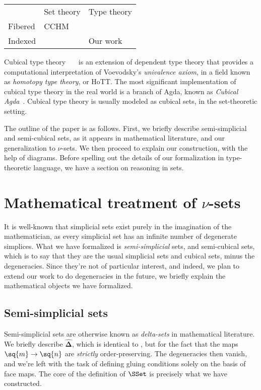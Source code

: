 \documentclass[10pt]{art.cls/art}
\newcommand{\DeltaHat}{\ensuremath{\hat{\boldsymbol{\Delta}}}}
\def\graymidrule{\arrayrulecolor{gray30}\midrule\arrayrulecolor{gray65}}
\begin{document}
\begin{table}[H]
  \begin{tabularx}{\linewidth}{p{.3\linewidth}|p{.3\linewidth}|p{.3\linewidth}}
    \toprule
            & Set theory & Type theory \\
    \graymidrule
    Fibered & CCHM       &             \\
    \graymidrule
    Indexed &            & Our work    \\
    \bottomrule
  \end{tabularx}
\end{table}

Cubical type theory~\cite{Bezem14}~\cite{Cohen16}~\cite{Angiuli17} is an extension of dependent type theory that provides a computational interpretation of Voevodsky's \emph{univalence axiom}, in a field known as \emph{homotopy type theory}, or HoTT. The most significant implementation of cubical type theory in the real world is a branch of Agda, known as \emph{Cubical Agda}~\cite{Vezzosi21}. Cubical type theory is usually modeled as cubical sets, in the set-theoretic setting.
\fi

The outline of the paper is as follows. First, we briefly describe semi-simplicial and semi-cubical sets, as it appears in mathematical literature, and our generalization to $\nu$-sets. We then proceed to explain our construction, with the help of diagrams. Before spelling out the details of our formalization in type-theoretic language, we have a section on reasoning in sets.

\section{Mathematical treatment of \texorpdfstring{$\nu$}{𝜈}-sets}
It is well-known that simplicial sets exist purely in the imagination of the mathematician, as every simplicial set has an infinite number of degenerate simplices. What we have formalized is \emph{semi-simplicial} sets, and semi-cubical sets, which is to say that they are the usual simplicial sets and cubical sets, minus the degeneracies. Since they're not of particular interest, and indeed, we plan to extend our work to do degeneracies in the future, we briefly explain the mathematical objects we have formalized.

\subsection{Semi-simplicial sets}
Semi-simplicial sets are otherwise known as \emph{delta-sets} in mathematical literature. We briefly describe \DeltaHat, which is identical to \Simplex{}, but for the fact that the maps $\sq{m} \rightarrow \sq{n}$ are \emph{strictly} order-preserving. The degeneracies then vanish, and we're left with the task of defining gluing conditions solely on the basis of face maps. The core of the definition of $\SSet$ is precisely what we have constructed.
\end{document}
